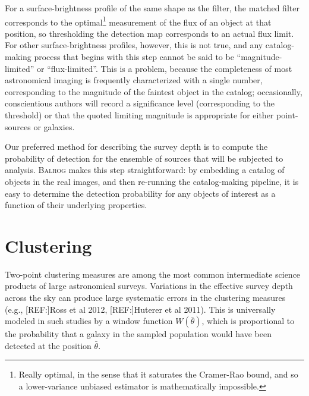 \documentclass[12pt]{book}
\newcommand{\balrog}{\textsc{Balrog}}
\begin{document}
For a surface-brightness profile of the same shape as the filter, the
matched filter corresponds to the optimal\footnote{Really optimal, in
  the sense that it saturates the Cramer-Rao bound, and so a
  lower-variance unbiased estimator is mathematically impossible.}
measurement of the flux of an object at that position, so thresholding
the detection map corresponds to an actual flux limit. For other
surface-brightness profiles, however, this is not true, and any
catalog-making process that begins with this step cannot be said to be
``magnitude-limited'' or ``flux-limited''. This is a problem, because
the completeness of most astronomical imaging is frequently
characterized with a single number, corresponding to the magnitude of
the faintest object in the catalog; occasionally, conscientious
authors will record a significance level (corresponding to the
threshold) or that the quoted limiting magnitude is appropriate
for either point-sources or galaxies. 

Our preferred method for describing the survey depth is to compute the
probability of detection for the ensemble of sources that will be
subjected to analysis. \balrog{} makes this step straightforward: by
embedding a catalog of objects in the real images, and then re-running
the catalog-making pipeline, it is easy to determine the detection
probability for any objects of interest as a function of their
underlying properties.


\section{Clustering}
Two-point clustering measures are among the most common intermediate
science products of large astronomical surveys. Variations in the
effective survey depth across the sky can produce large systematic
errors in the clustering measures (e.g., [REF:]Ross et al 2012, [REF:]Huterer et
al 2011). This is universally modeled in such studies  by a window
function $W(\bar{\theta})$, which is proportional to the probability
that a galaxy in the sampled population would have been detected at
the position $\bar{\theta}$.
\end{document}
